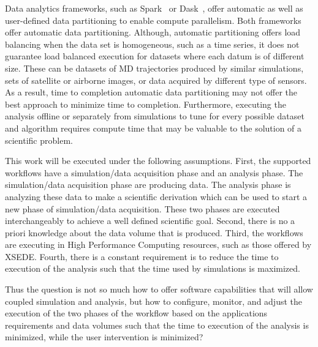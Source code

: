 Data analytics frameworks, such as Spark~\cite{zaharia2010spark} or Dask~\cite{rocklin2015dask}, 
offer automatic as well as user-defined data partitioning to enable compute parallelism. Both 
frameworks offer automatic data partitioning. Although, automatic partitioning offers load 
balancing when the data set is homogeneous, such as a time series, it does not guarantee load 
balanced execution for datasets where each datum is of different size. These can be datasets 
of MD trajectories produced by similar simulations, sets of satellite or airborne images, or 
data acquired by different type of sensors. As a result, time to completion automatic data 
partitioning may not offer the best approach to minimize time to completion. Furthermore, 
executing the analysis offline or separately from simulations to tune for every possible 
dataset and algorithm requires compute time that may be valuable to the solution of a scientific 
problem. 

This work will be executed under the following assumptions. First, the supported workflows have 
a simulation/data acquisition phase and an analysis phase. The simulation/data acquisition phase 
are producing data. The analysis phase is analyzing these data to make a scientific derivation 
which can be used to start a new phase of simulation/data acquisition. These two phases are 
executed interchangeably to achieve a well defined scientific goal. Second, there is no a priori 
knowledge about the data volume that is produced. Third, the workflows are executing in High 
Performance Computing resources, such as those offered by XSEDE. Fourth, there is a constant 
requirement is to reduce the time to execution of the analysis such that the time used by 
simulations is maximized.


Thus the question is not so much how to offer software capabilities that will allow coupled 
simulation and analysis, but how to configure, monitor, and adjust the execution of  the two
phases of the workflow based on the applications requirements and data volumes such that the 
time to execution of the analysis is minimized, while the user intervention is minimized?


